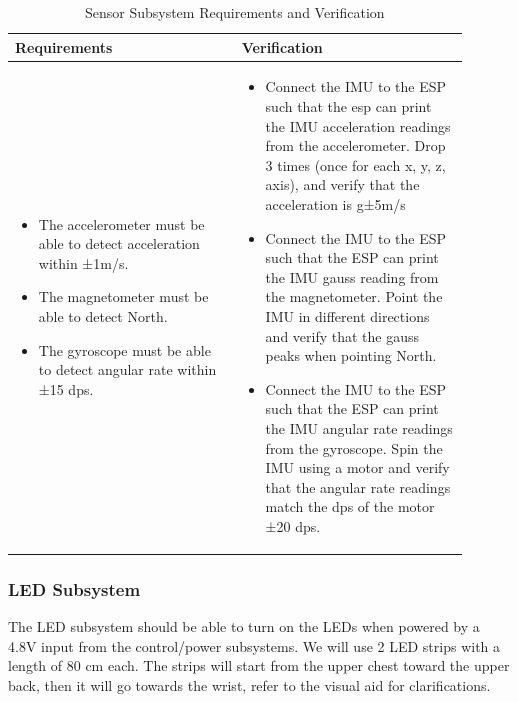 \documentclass[12pt]{article}
\begin{document}
    \begin{table}[h]
        \centering
        \caption{Sensor Subsystem Requirements and Verification}
        \begin{tabular}{p{0.45\linewidth}p{0.45\linewidth}}
        \toprule
        \textbf{Requirements} & \textbf{Verification} \\
        \midrule
        \begin{itemize}[leftmargin=*, nosep, after=\strut]
            \item The accelerometer must be able to detect acceleration within ±1m/s.
            \item The magnetometer must be able to detect North.
            \item The gyroscope must be able to detect angular rate within ±15 dps.
            
            
        \end{itemize} &
        \begin{itemize}[leftmargin=*, nosep, after=\strut]
            \item Connect the IMU to the ESP such that the esp can print the IMU acceleration readings from the accelerometer. Drop 3 times (once for each x, y, z, axis), and verify that the acceleration is g±5m/s
            \item Connect the IMU to the ESP such that the ESP can print the IMU gauss reading from the magnetometer. Point the IMU in different directions and verify that the gauss peaks when pointing North.
            \item Connect the IMU to the ESP such that the ESP can print the IMU angular rate readings from the gyroscope. Spin the IMU using a motor and verify that the angular rate readings match the dps of the motor ±20 dps.
            
        \end{itemize} \\
        \bottomrule
        \end{tabular}
        \end{table}
        \newpage
    \subsubsection{LED Subsystem} 
    The LED subsystem should be able to turn on the LEDs when powered by a 4.8V input from the control/power subsystems. We will use 2 LED strips with a length of 80 cm each. The strips will start from the upper chest toward the upper back, then it will go towards the wrist, refer to the visual aid for clarifications. 
\end{document}
